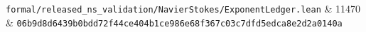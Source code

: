 \documentclass[10pt,a4paper]{article}
\begin{document}
{\begin{longtable}[]
\texttt{f\allowbreak{}o\allowbreak{}r\allowbreak{}m\allowbreak{}a\allowbreak{}l\allowbreak{}/\allowbreak{}r\allowbreak{}e\allowbreak{}l\allowbreak{}e\allowbreak{}a\allowbreak{}s\allowbreak{}e\allowbreak{}d\allowbreak{}\_\allowbreak{}n\allowbreak{}s\allowbreak{}\_\allowbreak{}v\allowbreak{}a\allowbreak{}l\allowbreak{}i\allowbreak{}d\allowbreak{}a\allowbreak{}t\allowbreak{}i\allowbreak{}o\allowbreak{}n\allowbreak{}/\allowbreak{}N\allowbreak{}a\allowbreak{}v\allowbreak{}i\allowbreak{}e\allowbreak{}r\allowbreak{}S\allowbreak{}t\allowbreak{}o\allowbreak{}k\allowbreak{}e\allowbreak{}s\allowbreak{}/\allowbreak{}E\allowbreak{}x\allowbreak{}p\allowbreak{}o\allowbreak{}n\allowbreak{}e\allowbreak{}n\allowbreak{}t\allowbreak{}L\allowbreak{}e\allowbreak{}d\allowbreak{}g\allowbreak{}e\allowbreak{}r\allowbreak{}.\allowbreak{}l\allowbreak{}e\allowbreak{}a\allowbreak{}n} & {}11470 & \texttt{0\allowbreak{}6\allowbreak{}b\allowbreak{}9\allowbreak{}d\allowbreak{}8\allowbreak{}d\allowbreak{}6\allowbreak{}4\allowbreak{}3\allowbreak{}9\allowbreak{}b\allowbreak{}0\allowbreak{}b\allowbreak{}d\allowbreak{}d\allowbreak{}7\allowbreak{}2\allowbreak{}f\allowbreak{}4\allowbreak{}4\allowbreak{}c\allowbreak{}e\allowbreak{}4\allowbreak{}0\allowbreak{}4\allowbreak{}b\allowbreak{}1\allowbreak{}c\allowbreak{}e\allowbreak{}9\allowbreak{}8\allowbreak{}6\allowbreak{}e\allowbreak{}6\allowbreak{}8\allowbreak{}f\allowbreak{}3\allowbreak{}6\allowbreak{}7\allowbreak{}c\allowbreak{}0\allowbreak{}3\allowbreak{}c\allowbreak{}7\allowbreak{}d\allowbreak{}f\allowbreak{}d\allowbreak{}5\allowbreak{}e\allowbreak{}d\allowbreak{}c\allowbreak{}a\allowbreak{}8\allowbreak{}e\allowbreak{}2\allowbreak{}d\allowbreak{}2\allowbreak{}a\allowbreak{}0\allowbreak{}1\allowbreak{}4\allowbreak{}0\allowbreak{}a} \\

\end{longtable}}
\end{document}
